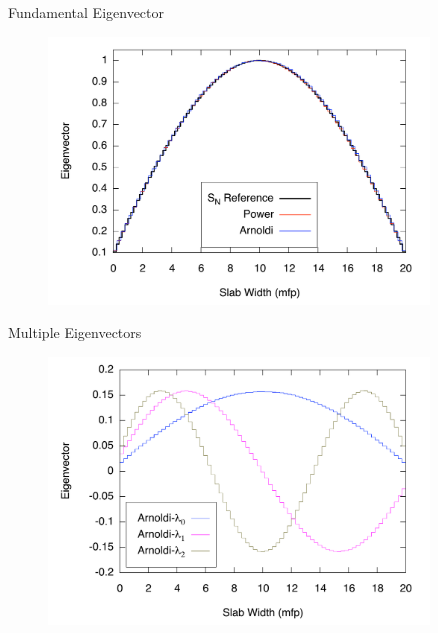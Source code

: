 \documentclass[xcolor={usenames, dvipsnames},]{beamer}
\begin{document}
\begin{frame}{Fundamental Eigenvector}
    \begin{figure} \centering
        \includegraphics[width=0.9\textwidth,keepaspectratio]{Figures/BasicFundamental}
    \end{figure}
\end{frame}

\begin{frame}{Multiple Eigenvectors}
    \begin{figure} \centering
        \includegraphics[width=0.9\textwidth,keepaspectratio]{Figures/BasicVectors}
    \end{figure}
\end{frame}
\end{document}
